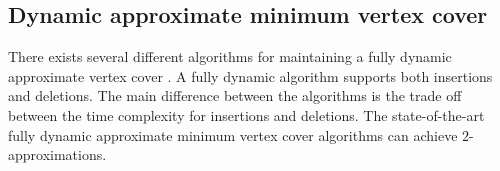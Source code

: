 \subsection{Dynamic approximate minimum vertex cover}
There exists several different algorithms for maintaining a fully dynamic approximate vertex cover \cite{2appdynvc, 2appdynvclogn, 2eappdynvc}. A fully dynamic algorithm supports both insertions and deletions. The main difference between the algorithms is the trade off between the time complexity for insertions and deletions. The state-of-the-art fully dynamic approximate minimum vertex cover algorithms can achieve $2$-approximations.





